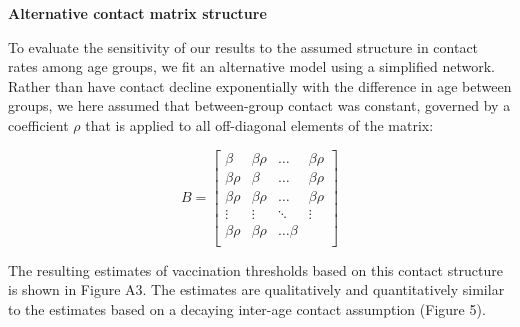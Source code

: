 \textbf{Alternative contact matrix structure}

To evaluate the sensitivity of our results to the assumed structure in contact rates among age groups, we fit an alternative model using a simplified network. Rather than have contact decline exponentially with the difference in age between groups, we here assumed that between-group contact was constant, governed by a coefficient $\rho$ that is applied to all off-diagonal elements of the matrix:

\begin{equation}
B = \left[{
\begin{array}{cccc}
  {\beta} & {\beta \rho} & \ldots &  {\beta \rho}  \\
  {\beta \rho} & {\beta} & \ldots &  {\beta \rho} \\
{\beta \rho} & {\beta \rho} & \ldots & {\beta \rho}  \\
  \vdots & \vdots & \ddots  & \vdots \\
  {\beta \rho} & {\beta \rho} & \ldots {\beta}  \\
\end{array}
}\right]
\end{equation}

The resulting estimates of vaccination thresholds based on this contact structure is shown in Figure A3. The estimates are qualitatively and quantitatively similar to the estimates based on a decaying inter-age contact assumption (Figure 5).